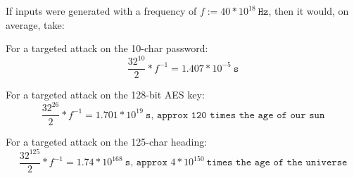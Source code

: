 \documentclass[a4paper]{scrreprt}
\begin{document}
If inputs were generated with a frequency of $f := 40 * 10^{18}\ \texttt{Hz}$,
then it would, on average, take:

For a targeted attack on the 10-char password:
\[
	\frac{32^{10}}{2} * f^{-1} = 1.407 * 10^{-5}\ \texttt{s}
\]


For a targeted attack on the 128-bit AES key:
\[
	\frac{32^{26}}{2} * f^{-1} = 1.701 * 10^{19}\ \texttt{s, approx 120 times the age of our sun}
\]


For a targeted attack on the 125-char heading:
\[
	\frac{32^{125}}{2} * f^{-1} = 1.74 * 10^{168}\ \texttt{s, approx } 4 * 10^{150}\ \texttt{times the age of the universe}
\]
\end{document}
